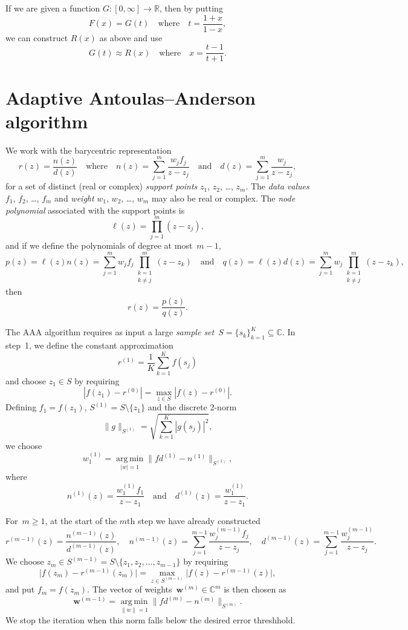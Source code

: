 \documentclass[12pt,a4paper]{article}
\newcommand{\argmin}{\operatorname*{arg\,min}}
\begin{document}
If we are given a function $G:[0,\infty]\to\mathbb{R}$, then by putting
\[
F(x)=G(t)\quad\text{where}\quad t=\frac{1+x}{1-x},
\]
we can construct $R(x)$ as above and use
\[
G(t)\approx R(x)\quad\text{where}\quad x=\frac{t-1}{t+1}.
\]
\section{Adaptive Antoulas--Anderson algorithm}
We work with the barycentric representation
\[
r(z)=\frac{n(z)}{d(z)}
\quad\text{where}\quad
n(z)=\sum_{j=1}^m\frac{w_jf_j}{z-z_j}
\quad\text{and}\quad
d(z)=\sum_{j=1}^m\frac{w_j}{z-z_j},
\]
for a set of distinct (real or complex) \emph{support points} $z_1$, $z_2$, 
\dots, $z_m$.  The \emph{data values} $f_1$, $f_2$, \dots, $f_m$ and 
\emph{weight} $w_1$, $w_2$, \dots, $w_m$ may also be real or complex.  The 
\emph{node polynomial} associated with the support points is
\[
\ell(z)=\prod_{j=1}^m(z-z_j),
\]
and if we define the polynomials of degree at most~$m-1$,
\[
p(z)=\ell(z)n(z)=\sum_{j=1}^mw_jf_j\prod_{\substack{k=1\\ k\ne j}}^m(z-z_k)
\quad\text{and}\quad 
q(z)=\ell(z)d(z)=\sum_{j=1}^mw_j\prod_{\substack{k=1\\ k\ne j}}^m(z-z_k),
\]
then
\[
r(z)=\frac{p(z)}{q(z)}.
\]

The AAA algorithm requires as input a large 
\emph{sample set}~$S=\{s_k\}_{k=1}^K\subseteq\mathbb{C}$.  In step~1,
we define the constant approximation
\[
r^{(1)}=\frac{1}{K}\sum_{k=1}^Kf(s_j)
\]
and choose $z_1\in S$ by requiring
\[
|f(z_1)-r^{(0)}|=\max_{z\in S}|f(z)-r^{(0)}|.
\]
Defining $f_1=f(z_1)$, $S^{(1)}=S\setminus\{z_1\}$ and the discrete 2-norm
\[
\|g\|_{S^{(1)}}=\sqrt{\sum_{k=1}^K|g(s_j)|^2},
\]
we choose
\[
w^{(1)}_1=\argmin_{|w|=1}
\bigl\|fd^{(1)}-n^{(1)}\bigr\|_{S^{(1)}},
\]
where
\[
n^{(1)}(z)=\frac{w^{(1)}_1f_1}{z-z_1}\quad\text{and}\quad
d^{(1)}(z)=\frac{w^{(1)}_1}{z-z_1}.
\]

For~$m\ge1$, at the start of the $m$th step we have already constructed
\[
r^{(m-1)}(z)=\frac{n^{(m-1)}(z)}{d^{(m-1)}(z)},\quad
n^{(m-1)}(z)=\sum_{j=1}^{m-1}\frac{w^{(m-1)}_jf_j}{z-z_j},\quad
d^{(m-1)}(z)=\sum_{j=1}^{m-1}\frac{w^{(m-1)}_j}{z-z_j}.
\]
We choose $z_m\in S^{(m-1)}=S\setminus\{z_1,z_2,\ldots,z_{m-1}\}$ by requiring
\[
\bigl|f(z_m)-r^{(m-1)}(z_m)\bigr|=\max_{z\in S^{(m-1)}}
    \bigl|f(z)-r^{(m-1)}(z)\bigr|,
\]
and put $f_m=f(z_m)$.  The vector of 
weights~$\boldsymbol{w}^{(m)}\in\mathbb{C}^m$ is then chosen as
\[
\boldsymbol{w}^{(m-1)}=\argmin_{\|w\|=1}\|fd^{(m)}-n^{(m)}\|_{S^{(m)}}.
\]
We stop the iteration when this norm falls below the desired error threshhold.
\end{document}
